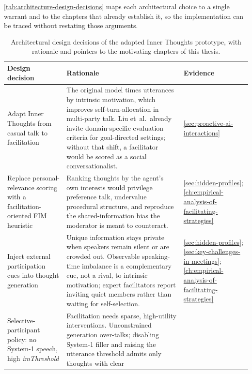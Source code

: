 \autoref{tab:architecture-design-decisions} maps each architectural choice to a single warrant and to the
chapters that already establish it, so the implementation can be traced without restating those arguments.
\clearpage
\begin{table}[H]
  \centering
  \caption{Architectural design decisions of the adapted Inner Thoughts prototype, with rationale and
  pointers to the motivating chapters of this thesis.}
  \label{tab:architecture-design-decisions}
  \small
  \setlength{\tabcolsep}{4pt}
  \begin{tabularx}{\textwidth}{@{}
      >{\raggedright\arraybackslash}p{2.85cm}
      >{\raggedright\arraybackslash}X
      >{\raggedright\arraybackslash}p{3.55cm}
    @{}}
    \toprule
    \textbf{Design decision} & \textbf{Rationale} & \textbf{Evidence} \\
    \midrule
    Adapt Inner Thoughts from casual talk to facilitation
    & The original model times utterances by intrinsic motivation, which improves self-turn-allocation
    in multi-party talk. Liu et~al.\ already invite domain-specific evaluation criteria for
    goal-directed settings; without that shift, a facilitator would be scored as a social
    conversationalist.
    & \autoref{sec:proactive-ai-interactions} \\
    \addlinespace
    Replace personal-relevance scoring with a facilitation-oriented FIM heuristic
    & Ranking thoughts by the agent's own interests would privilege preference talk, undervalue
    procedural structure, and reproduce the shared-information bias the moderator is meant to
    counteract.
    & \autoref{sec:hidden-profiles};
    \autoref{ch:empirical-analysis-of-facilitating-strategies} \\
    \addlinespace
    Inject external participation cues into thought generation
    & Unique information stays private when speakers remain silent or are crowded out. Observable
    speaking-time imbalance is a complementary cue, not a rival, to intrinsic motivation; expert
    facilitators report inviting quiet members rather than waiting for self-selection.
    & \autoref{sec:hidden-profiles};
    \autoref{sec:key-challenges-in-meetings};
    \autoref{ch:empirical-analysis-of-facilitating-strategies} \\
    \addlinespace
    Selective-participant policy: no System-1 speech, high \textit{imThreshold}
    & Facilitation needs sparse, high-utility interventions. Unconstrained generation over-talks;
    disabling System-1 filler and raising the utterance threshold admits only thoughts with clear

\end{tabularx}
\end{table}
